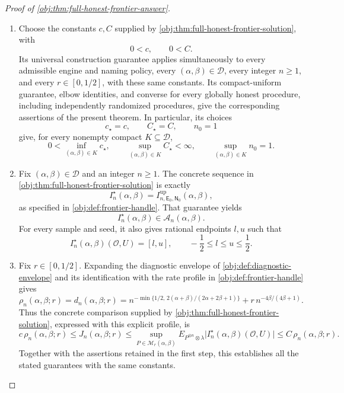 \documentclass[11pt]{article}
\begin{document}
\begin{proof}[Proof of \cref{obj:thm:full-honest-frontier-answer}]
\begin{enumerate}
\item Choose the constants \(c,C\) supplied by
\cref{obj:thm:full-honest-frontier-solution}, with
\[
0<c,\qquad 0<C.
\]
Its universal construction guarantee applies simultaneously to every admissible engine and naming policy, every \((\alpha,\beta)\in\mathcal D\), every integer \(n\ge1\), and every \(r\in[0,1/2]\), with these same constants. Its compact-uniform guarantee, elbow identities, and converse for every globally honest procedure, including independently randomized procedures, give the corresponding assertions of the present theorem. In particular, its choices
\[
c_\star=c,\qquad C_\star=C,\qquad n_0=1
\]
give, for every nonempty compact \(K\subseteq\mathcal D\),
\[
0<\inf_{(\alpha,\beta)\in K}c_\star,\qquad
\sup_{(\alpha,\beta)\in K}C_\star<\infty,\qquad
\sup_{(\alpha,\beta)\in K}n_0=1.
\]

\item Fix \((\alpha,\beta)\in\mathcal D\) and an integer \(n\ge1\). The concrete sequence in
\cref{obj:thm:full-honest-frontier-solution} is exactly
\[
I_n^\star(\alpha,\beta)
=I^{\mathrm{up}}_{n,\mathsf E_0,\mathsf N_0}(\alpha,\beta),
\]
as specified in \cref{obj:def:frontier-handle}. That guarantee yields
\[
I_n^\star(\alpha,\beta)\in\mathcal A_n(\alpha,\beta).
\]
For every sample and seed, it also gives rational endpoints \(l,u\) such that
\[
I_n^\star(\alpha,\beta)(\mathcal O,U)=[l,u],
\qquad
-\frac12\le l\le u\le\frac12.
\]

\item Fix \(r\in[0,1/2]\). Expanding the diagnostic envelope of
\cref{obj:def:diagnostic-envelope} and its identification with the rate profile in
\cref{obj:def:frontier-handle} gives
\[
\rho_n(\alpha,\beta;r)=d_n(\alpha,\beta;r)
=
n^{-\min\{1/2,\,2(\alpha+\beta)/(2\alpha+2\beta+1)\}}
+r\,n^{-4\beta/(4\beta+1)}.
\]
Thus the concrete comparison supplied by
\cref{obj:thm:full-honest-frontier-solution}, expressed with this explicit profile, is
\[
c\,\rho_n(\alpha,\beta;r)
\le J_n(\alpha,\beta;r)
\le
\sup_{P\in\mathcal M_r(\alpha,\beta)}
E_{P^{\otimes n}\otimes\lambda}
\bigl|I_n^\star(\alpha,\beta)(\mathcal O,U)\bigr|
\le C\,\rho_n(\alpha,\beta;r).
\]
Together with the assertions retained in the first step, this establishes all the stated guarantees with the same constants.
\end{enumerate}
\end{proof}
\end{document}
